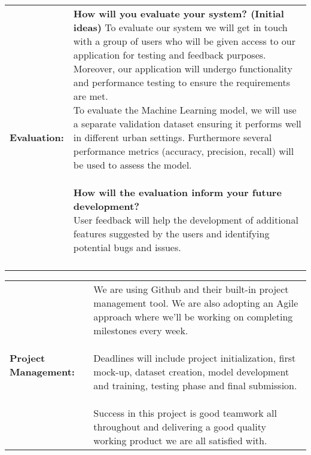 \documentclass[a4paper,12pt]{article}
\begin{document}
\begin{tabular}{|p{}|p{}|}
    \hline
   \textbf{Evaluation:} & \parbox{0.65\textwidth}{\vspace{0.3cm}\textbf{How will you evaluate your system? (Initial ideas)} \vspace{0.3cm}
   To evaluate our system we will get in touch with a group of users who will be given access to our application for testing and feedback purposes. Moreover, our application will undergo functionality and performance testing to ensure the requirements are met.
   \\
   To evaluate the Machine Learning model, we will use a separate validation dataset ensuring it performs well in different urban settings. Furthermore several performance metrics (accuracy, precision, recall) will be used to assess the model.
   \\
   \\
   \vspace{0.3cm}\textbf{ How will the evaluation inform your future development?}\vspace{0.3cm}
   \\
   User feedback will help the development of additional features suggested by the users and identifying potential bugs and issues.
   \\
   \\
    } \\
   \hline
\end{tabular}

\vspace{0.5cm}

\centering
\begin{tabular}{|p{}|p{}|}
    \hline
    \textbf{Project Management:} & \parbox{0.65\textwidth}{\vspace{0.3cm}
    We are using Github and their built-in project management tool. We are also adopting an Agile approach where we'll be working on completing milestones every week.\\ \\
    Deadlines will include project initialization, first mock-up, dataset creation, model development and training, testing phase and final submission. \\ \\
    Success in this project is good teamwork all throughout and delivering a good quality working product we are all satisfied with.
    \vspace{0.3cm}} \\
    \hline
\end{tabular}
\end{document}
